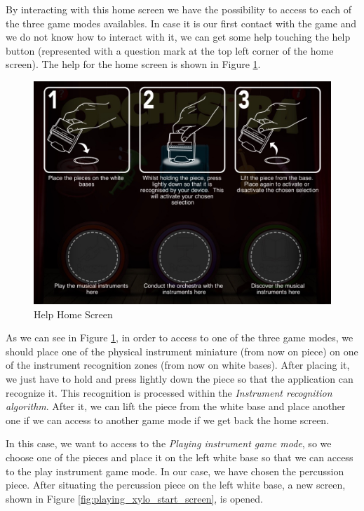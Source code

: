 \newpage

By interacting with this home screen we have the possibility to access to each of the three game modes availables. In case it is our first contact with the game and we do not know how to interact with it, we can get some help touching the help button (represented with a question mark at the top left corner of the home screen). The help for the home screen is shown in Figure \ref{fig:help_home_screen}.

\begin{figure}[ht!]
	\centering
	\includegraphics[width=400pt]{graphics/use-case/help_home_screen.jpg}
	\caption{Help Home Screen}
	\label{fig:help_home_screen}
\end{figure}

As we can see in Figure \ref{fig:help_home_screen}, in order to access to one of the three game modes, we should place one of the physical instrument miniature (from now on piece) on one of the instrument recognition zones (from now on white bases). After placing it, we just have to hold and press lightly down the piece so that the application can recognize it. This recognition is processed within the \textit{Instrument recognition algorithm}. After it, we can lift the piece from the white base and place another one if we can access to another game mode if we get back the home screen.

In this case, we want to access to the \textit{Playing instrument game mode}, so we choose one of the pieces and place it on the left white base so that we can access to the play instrument game mode. In our case, we have chosen the percussion piece. After situating the percussion piece on the left white base, a new screen, shown in Figure \ref{fig:playing_xylo_start_screen}, is opened.

